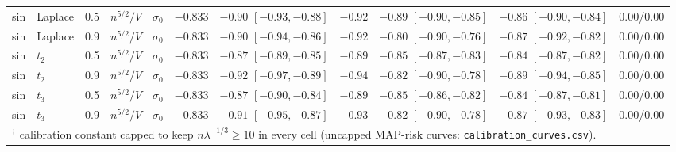 \begin{longtable}{lllllcccccc}
sin & Laplace & 0.5 & $n^{5/2}/V$ & $\sigma_0$ & $-0.833$ & $-0.90$ {\scriptsize $[-0.93, -0.88]$} & $-0.92$ & $-0.89$ {\scriptsize $[-0.90, -0.85]$} & $-0.86$ {\scriptsize $[-0.90, -0.84]$} & 0.00/0.00 \\
sin & Laplace & 0.9 & $n^{5/2}/V$ & $\sigma_0$ & $-0.833$ & $-0.90$ {\scriptsize $[-0.94, -0.86]$} & $-0.92$ & $-0.80$ {\scriptsize $[-0.90, -0.76]$} & $-0.87$ {\scriptsize $[-0.92, -0.82]$} & 0.00/0.00 \\
sin & $t_2$ & 0.5 & $n^{5/2}/V$ & $\sigma_0$ & $-0.833$ & $-0.87$ {\scriptsize $[-0.89, -0.85]$} & $-0.89$ & $-0.85$ {\scriptsize $[-0.87, -0.83]$} & $-0.84$ {\scriptsize $[-0.87, -0.82]$} & 0.00/0.00 \\
sin & $t_2$ & 0.9 & $n^{5/2}/V$ & $\sigma_0$ & $-0.833$ & $-0.92$ {\scriptsize $[-0.97, -0.89]$} & $-0.94$ & $-0.82$ {\scriptsize $[-0.90, -0.78]$} & $-0.89$ {\scriptsize $[-0.94, -0.85]$} & 0.00/0.00 \\
sin & $t_3$ & 0.5 & $n^{5/2}/V$ & $\sigma_0$ & $-0.833$ & $-0.87$ {\scriptsize $[-0.90, -0.84]$} & $-0.89$ & $-0.85$ {\scriptsize $[-0.86, -0.82]$} & $-0.84$ {\scriptsize $[-0.87, -0.81]$} & 0.00/0.00 \\
sin & $t_3$ & 0.9 & $n^{5/2}/V$ & $\sigma_0$ & $-0.833$ & $-0.91$ {\scriptsize $[-0.95, -0.87]$} & $-0.93$ & $-0.82$ {\scriptsize $[-0.90, -0.78]$} & $-0.87$ {\scriptsize $[-0.93, -0.83]$} & 0.00/0.00 \\
\bottomrule
\multicolumn{11}{l}{\footnotesize $^\dagger$ calibration constant capped to keep $n\lambda^{-1/3} \ge 10$ in every cell (uncapped MAP-risk curves: \texttt{calibration\_curves.csv}).}
\end{longtable}
